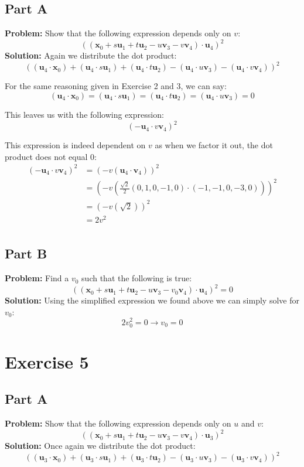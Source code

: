 \documentclass{article}
\begin{document}
\subsection*{Part A}
\textbf{Problem:} Show that the following expression depends only on $v$:
$$((\mathbf x_0+s\mathbf u_1+t\mathbf u_2-u\mathbf v_3-v\mathbf v_4)\cdot\mathbf u_4)^2$$
\textbf{Solution:} Again we distribute the dot product:
$$((\mathbf u_4\cdot\mathbf x_0)+(\mathbf u_4\cdot s\mathbf u_1)+(\mathbf u_4\cdot t\mathbf u_2)-(\mathbf u_4\cdot u\mathbf v_3)-(\mathbf u_4\cdot v\mathbf v_4))^2$$

For the same reasoning given in Exercise 2 and 3, we can say:
$$(\mathbf u_4\cdot\mathbf x_0)=(\mathbf u_4\cdot s\mathbf u_1)=(\mathbf u_4\cdot t\mathbf u_2)=(\mathbf u_4\cdot u\mathbf v_3)=0$$

This leaves us with the following expression:
$$(-\mathbf u_4\cdot v\mathbf v_4)^2$$

This expression is indeed dependent on $v$ as when we factor it out, the dot product does not equal 0:
\begin{align*}
  (-\mathbf u_4\cdot v\mathbf v_4)^2&=(-v(\mathbf u_4\cdot \mathbf v_4))^2\\
  &=\left(-v\left(\frac{\sqrt 2}{2}(0,1,0,-1,0)\cdot(-1, -1, 0, -3, 0)\right)\right)^2\\
  &=\left(-v\left(\sqrt 2\right)\right)^2\\
  &=2v^2\\
\end{align*}
\subsection*{Part B}
\textbf{Problem:} Find a $v_0$ such that the following is true:
$$((\mathbf x_0+s\mathbf u_1+t\mathbf u_2-u\mathbf v_3-v_0\mathbf v_4)\cdot\mathbf u_4)^2=0$$
\textbf{Solution:} Using the simplified expression we found above we can simply solve for $v_0$:
$$2v_0^2=0\rightarrow \boxed{v_0=0}$$

\section*{Exercise 5}
\subsection*{Part A}
\textbf{Problem:} Show that the following expression depends only on $u$ and $v$:
$$((\mathbf x_0+s\mathbf u_1+t\mathbf u_2-u\mathbf v_3-v\mathbf v_4)\cdot\mathbf u_3)^2$$
\textbf{Solution:} Once again we distribute the dot product:
$$((\mathbf u_3\cdot\mathbf x_0)+(\mathbf u_3\cdot s\mathbf u_1)+(\mathbf u_3\cdot t\mathbf u_2)-(\mathbf u_3\cdot u\mathbf v_3)-(\mathbf u_3\cdot v\mathbf v_4))^2$$
\end{document}
